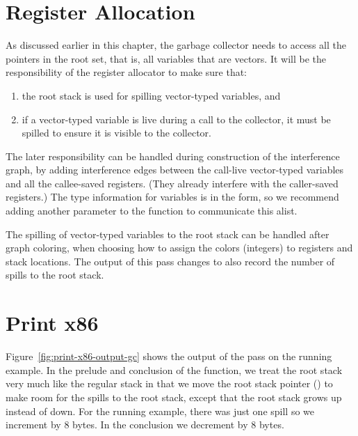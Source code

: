 \documentclass[11pt]{book}
\newcommand{\ocaml}[1]{{\color{blue}{#1}}}
\begin{document}
\clearpage

\section{Register Allocation}
\label{sec:reg-alloc-gc}

As discussed earlier in this chapter, the garbage collector needs to
access all the pointers in the root set, that is, all variables that
are vectors. It will be the responsibility of the register allocator
to make sure that:
\begin{enumerate}
\item the root stack is used for spilling vector-typed variables, and
\item if a vector-typed variable is live during a call to the
  collector, it must be spilled to ensure it is visible to the
  collector.
\end{enumerate}

The later responsibility can be handled during construction of the
interference graph, by adding interference edges between the call-live
vector-typed variables and all the callee-saved registers. (They
already interfere with the caller-saved registers.)  The type
information for variables is in the  form, so we
recommend adding another parameter to the 
function to communicate this alist.

The spilling of vector-typed variables to the root stack can be
handled after graph coloring, when choosing how to assign the colors
(integers) to registers and stack locations. The  output
of this pass changes to also record the number of spills to the root
stack.

%





\section{Print x86}
\label{sec:print-x86-gc}

Figure~\ref{fig:print-x86-output-gc} shows the output of the
 pass on the running example. In the prelude and
conclusion of the  function, we treat the root stack very
much like the regular stack in that we move the root stack pointer
() to make room for the spills to the root stack, except
that the root stack grows up instead of down.  For the running
example, there was just one spill so we increment  by 8
bytes. In the conclusion we decrement  by 8 bytes.
\ocaml{Out of sheer laziness, we don't check for possible overflow
  of the root stack. A production system would need to do this.}
\end{document}
